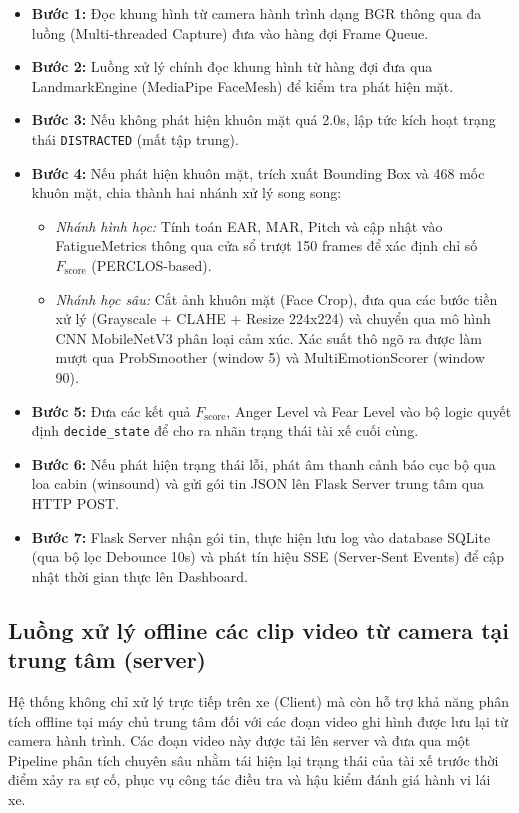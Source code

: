 \documentclass[../DoAn.tex]{subfiles}
\begin{document}
\begin{itemize}
    \item \textbf{Bước 1:} Đọc khung hình từ camera hành trình dạng BGR thông qua đa luồng (Multi-threaded Capture) đưa vào hàng đợi Frame Queue.
    \item \textbf{Bước 2:} Luồng xử lý chính đọc khung hình từ hàng đợi đưa qua LandmarkEngine (MediaPipe FaceMesh) để kiểm tra phát hiện mặt.
    \item \textbf{Bước 3:} Nếu không phát hiện khuôn mặt quá 2.0s, lập tức kích hoạt trạng thái \texttt{DISTRACTED} (mất tập trung).
    \item \textbf{Bước 4:} Nếu phát hiện khuôn mặt, trích xuất Bounding Box và 468 mốc khuôn mặt, chia thành hai nhánh xử lý song song:
    \begin{itemize}
        \item \textit{Nhánh hình học:} Tính toán EAR, MAR, Pitch và cập nhật vào FatigueMetrics thông qua cửa sổ trượt 150 frames để xác định chỉ số $F_{\text{score}}$ (PERCLOS-based).
        \item \textit{Nhánh học sâu:} Cắt ảnh khuôn mặt (Face Crop), đưa qua các bước tiền xử lý (Grayscale + CLAHE + Resize 224x224) và chuyển qua mô hình CNN MobileNetV3 phân loại cảm xúc. Xác suất thô ngõ ra được làm mượt qua ProbSmoother (window 5) và MultiEmotionScorer (window 90).
    \end{itemize}
    \item \textbf{Bước 5:} Đưa các kết quả $F_{\text{score}}$, Anger Level và Fear Level vào bộ logic quyết định \texttt{decide\_state} để cho ra nhãn trạng thái tài xế cuối cùng.
    \item \textbf{Bước 6:} Nếu phát hiện trạng thái lỗi, phát âm thanh cảnh báo cục bộ qua loa cabin (winsound) và gửi gói tin JSON lên Flask Server trung tâm qua HTTP POST.
    \item \textbf{Bước 7:} Flask Server nhận gói tin, thực hiện lưu log vào database SQLite (qua bộ lọc Debounce 10s) và phát tín hiệu SSE (Server-Sent Events) để cập nhật thời gian thực lên Dashboard.
\end{itemize}

\subsection{Luồng xử lý offline các clip video từ camera tại trung tâm (server)}
Hệ thống không chỉ xử lý trực tiếp trên xe (Client) mà còn hỗ trợ khả năng phân tích offline tại máy chủ trung tâm đối với các đoạn video ghi hình được lưu lại từ camera hành trình. Các đoạn video này được tải lên server và đưa qua một Pipeline phân tích chuyên sâu nhằm tái hiện lại trạng thái của tài xế trước thời điểm xảy ra sự cố, phục vụ công tác điều tra và hậu kiểm đánh giá hành vi lái xe.
\end{document}
